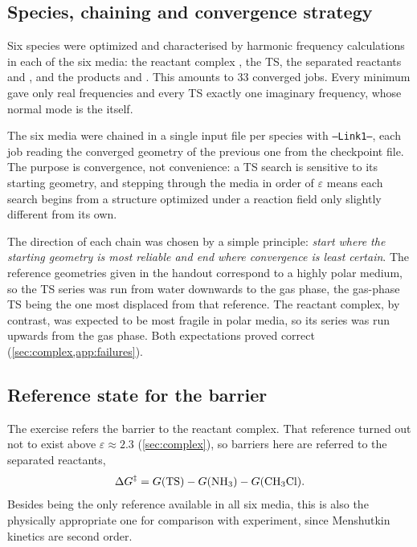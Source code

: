 \documentclass[10pt,a4paper]{article}
\begin{document}
\subsection{Species, chaining and convergence strategy}

Six species were optimized and characterised by harmonic frequency calculations in
each of the six media: the reactant complex , the TS, the
separated reactants  and , and the products  and
. This amounts to 33 converged jobs. Every minimum gave only real
frequencies and every TS exactly one imaginary frequency, whose normal mode is the
 itself.

The six media were chained in a single input file per species with
\texttt{--Link1--}, each job reading the converged geometry of the previous one from
the checkpoint file. The purpose is convergence, not convenience: a TS search is
sensitive to its starting geometry, and stepping through the media in order of
$\varepsilon$ means each search begins from a structure optimized under a reaction
field only slightly different from its own.

The direction of each chain was chosen by a simple principle: \emph{start where the
starting geometry is most reliable and end where convergence is least certain}. The
reference geometries given in the handout correspond to a highly polar medium, so
the TS series was run from water downwards to the gas phase, the gas-phase TS being
the one most displaced from that reference. The reactant complex, by contrast, was
expected to be most fragile in polar media, so its series was run upwards from the
gas phase. Both expectations proved correct (\cref{sec:complex,app:failures}).

\subsection{Reference state for the barrier}

The exercise refers the barrier to the reactant complex. That reference turned out
not to exist above $\varepsilon \approx 2.3$ (\cref{sec:complex}), so barriers here
are referred to the separated reactants,
%
\begin{equation}
  \Delta G^{\ddagger} = G(\mathrm{TS}) - G(\ce{NH3}) - G(\ce{CH3Cl}).
\end{equation}
%
Besides being the only reference available in all six media, this is also the
physically appropriate one for comparison with experiment, since Menshutkin
kinetics are second order.
\end{document}
